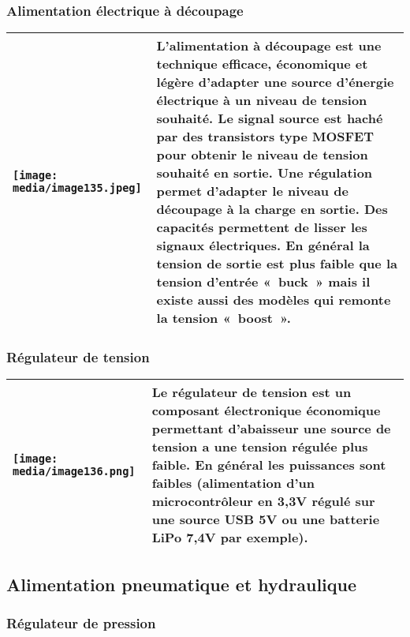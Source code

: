 \documentclass[
]{article}
\begin{document}
\hypertarget{alimentation-uxe9lectrique-uxe0-duxe9coupage}{%
\subsubsection{Alimentation électrique à
découpage}\label{alimentation-uxe9lectrique-uxe0-duxe9coupage}}

\begin{longtable}[]{@{}ll@{}}
\toprule
\endhead
\texttt{[image: media/image135.jpeg]}
& L'alimentation à découpage est une technique efficace, économique et
légère d'adapter une source d'énergie électrique à un niveau de tension
souhaité. Le signal source est haché par des transistors type MOSFET
pour obtenir le niveau de tension souhaité en sortie. Une régulation
permet d'adapter le niveau de découpage à la charge en sortie. Des
capacités permettent de lisser les signaux électriques. En général la
tension de sortie est plus faible que la tension d'entrée «~buck~» mais
il existe aussi des modèles qui remonte la tension «~boost~». \\
\bottomrule
\end{longtable}

\hypertarget{ruxe9gulateur-de-tension}{%
\subsubsection{Régulateur de tension}\label{ruxe9gulateur-de-tension}}

\begin{longtable}[]{@{}ll@{}}
\toprule
\endhead
\texttt{[image: media/image136.png]} &
Le régulateur de tension est un composant électronique économique
permettant d'abaisseur une source de tension a une tension régulée plus
faible. En général les puissances sont faibles (alimentation d'un
microcontrôleur en 3,3V régulé sur une source USB 5V ou une batterie
LiPo 7,4V par exemple). \\
\bottomrule
\end{longtable}

\hypertarget{alimentation-pneumatique-et-hydraulique}{%
\subsection{Alimentation pneumatique et
hydraulique}\label{alimentation-pneumatique-et-hydraulique}}

\hypertarget{ruxe9gulateur-de-pression}{%
\subsubsection{Régulateur de pression}\label{ruxe9gulateur-de-pression}}
\end{document}

